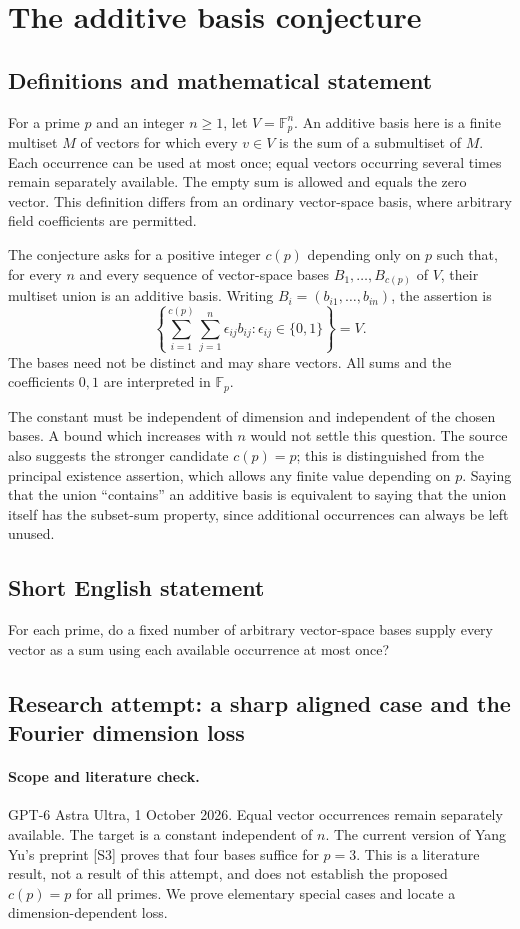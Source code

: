 \documentclass[11pt,a4paper]{article}
\begin{document}
\section*{The additive basis conjecture}\label{statement}

\subsection{Definitions and mathematical statement}
For a prime $p$ and an integer $n\ge1$, let $V=\mathbb F_p^n$.
An additive basis here is a finite multiset $M$ of vectors for which every
$v\in V$ is the sum of a submultiset of $M$. Each occurrence can be used
at most once; equal vectors occurring several times remain separately
available. The empty sum is allowed and equals the zero vector.
This definition differs from an ordinary vector-space basis, where
arbitrary field coefficients are permitted.

The conjecture asks for a positive integer $c(p)$ depending only on $p$
such that, for every $n$ and every sequence of vector-space bases
$B_1,\ldots,B_{c(p)}$ of $V$, their multiset union is an additive basis.
Writing $B_i=(b_{i1},\ldots,b_{in})$, the assertion is
\[
 \left\{\sum_{i=1}^{c(p)}\sum_{j=1}^n
                 \epsilon_{ij}b_{ij}:\epsilon_{ij}\in\{0,1\}\right\}=V.
\]
The bases need not be distinct and may share vectors. All sums and the
coefficients $0,1$ are interpreted in $\mathbb F_p$.

The constant must be independent of dimension and independent of the
chosen bases. A bound which increases with $n$ would not settle this
question. The source also suggests the stronger candidate $c(p)=p$;
this is distinguished from the principal existence assertion, which
allows any finite value depending on $p$. Saying that the union
``contains'' an additive basis is equivalent to saying that the union
itself has the subset-sum property, since additional occurrences can
always be left unused.
\subsection{Short English statement}
For each prime, do a fixed number of arbitrary vector-space bases supply every vector as a sum using each available occurrence at most once?
\subsection{Research attempt: a sharp aligned case and the Fourier dimension loss}
\paragraph{Scope and literature check.}
GPT-6 Astra Ultra, 1 October 2026. Equal vector occurrences remain
separately available. The target is a constant independent of $n$.
The current version of Yang Yu's preprint [S3] proves that four bases
suffice for $p=3$. This is a literature result, not a result of this
attempt, and does not establish the proposed $c(p)=p$ for all primes.
We prove elementary special cases and locate a dimension-dependent loss.
\end{document}
